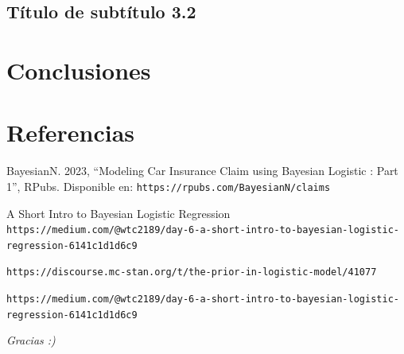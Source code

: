 \documentclass[letter]{article}
\begin{document}
\subsection{Título de subtítulo 3.2}

\section{Conclusiones}

\section*{Referencias}
BayesianN. 2023, ``Modeling Car Insurance Claim using Bayesian Logistic : Part 1'', RPubs. Disponible en: \texttt{https://rpubs.com/BayesianN/claims}

A Short Intro to Bayesian Logistic Regression \texttt{https://medium.com/@wtc2189/day-6-a-short-intro-to-bayesian-logistic-regression-6141c1d1d6c9}

\texttt{https://discourse.mc-stan.org/t/the-prior-in-logistic-model/41077}


\texttt{https://medium.com/@wtc2189/day-6-a-short-intro-to-bayesian-logistic-regression-6141c1d1d6c9}





\vfill

\begin{flushright}
    \textit{Gracias :)}
\end{flushright}
\end{document}
